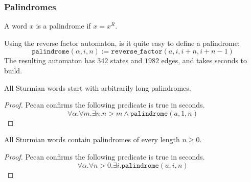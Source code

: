 \subsubsection{Palindromes}

\begin{definition}
    A word $x$ is a palindrome if $x = x^R$.
\end{definition}

Using the reverse factor automaton, is it quite easy to define a palindrome:
\[
    \texttt{palindrome}(\alpha, i, n) := \texttt{reverse\_factor}(a, i, i + n, i + n - 1)
\]
The resulting automaton has $342$ states and $1982$ edges, and takes  seconds to build.

\begin{theorem}
    All Sturmian words start with arbitrarily long palindromes.
\end{theorem}
\begin{proof}
Pecan confirms the following predicate is true in  seconds.
\[
    \forall \alpha. \forall m. \exists n. n > m \land \texttt{palindrome}(a, 1, n)
\]
\end{proof}

\begin{theorem}
    All Sturmian words contain palindromes of every length $n \geq 0$.
\end{theorem}
\begin{proof}
    Pecan confirms the following predicate is true in  seconds.
    \[
        \forall \alpha. \forall n > 0. \exists i. \texttt{palindrome}(a, i, n)
    \]
\end{proof}

